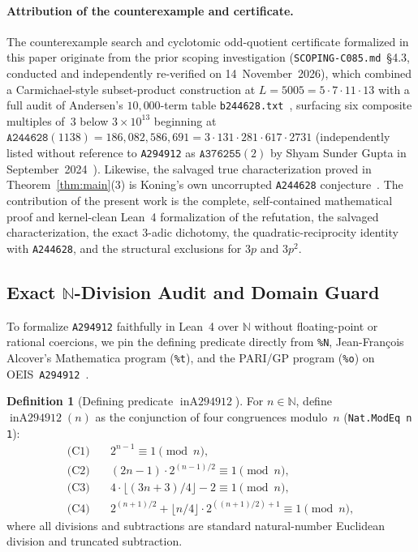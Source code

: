 \documentclass[11pt]{article}
\theoremstyle{definition}
\newtheorem{definition}[theorem]{Definition}
\newcommand{\N}{\mathbb{N}}
\newcommand{\seq}[1]{\texttt{#1}}
\newcommand{\inA}{\operatorname{inA294912}}
\begin{document}
\paragraph{Attribution of the counterexample and certificate.}
The counterexample search and cyclotomic odd-quotient certificate formalized in this paper originate from the prior scoping investigation (\texttt{SCOPING-C085.md}~\S4.3, conducted and independently re-verified on 14~November~2026), which combined a Carmichael-style subset-product construction at $L = 5005 = 5 \cdot 7 \cdot 11 \cdot 13$ with a full audit of Andersen's $10{,}000$-term table \texttt{b244628.txt}~\cite{b244628}, surfacing six composite multiples of~$3$ below $3 \times 10^{13}$ beginning at $\seq{A244628}(1138) = 186{,}082{,}586{,}691 = 3 \cdot 131 \cdot 281 \cdot 617 \cdot 2731$ (independently listed without reference to \seq{A294912} as $\seq{A376255}(2)$ by Shyam Sunder Gupta in September~2024~\cite{oeis376255}). Likewise, the salvaged true characterization proved in Theorem~\ref{thm:main}(3) is Koning's own uncorrupted \seq{A244628} conjecture~\cite{oeis244628}. The contribution of the present work is the complete, self-contained mathematical proof and kernel-clean Lean~4 formalization of the refutation, the salvaged characterization, the exact $3$-adic dichotomy, the quadratic-reciprocity identity with \seq{A244628}, and the structural exclusions for $3p$ and $3p^2$.

\subsection{Exact \texorpdfstring{$\N$}{N}-Division Audit and Domain Guard}
\label{sec:conventions}

To formalize \seq{A294912} faithfully in Lean~4 over $\N$ without floating-point or rational coercions, we pin the defining predicate directly from \texttt{\%N}, Jean-Fran\c{c}ois Alcover's Mathematica program (\texttt{\%t}), and the PARI/GP program (\texttt{\%o}) on OEIS~\seq{A294912}~\cite{oeis294912}.

\begin{definition}[Defining predicate $\inA$]
\label{def:inA294912}
For $n \in \N$, define $\inA(n)$ as the conjunction of four congruences modulo~$n$ (\texttt{Nat.ModEq n \textperiodcentered{} 1}):
\begin{align*}
\text{(C1)} &\quad 2^{n - 1} \equiv 1 \pmod n, \\
\text{(C2)} &\quad (2n - 1) \cdot 2^{(n - 1)/2} \equiv 1 \pmod n, \\
\text{(C3)} &\quad 4 \cdot \lfloor (3n + 3)/4 \rfloor - 2 \equiv 1 \pmod n, \\
\text{(C4)} &\quad 2^{(n + 1)/2} + \lfloor n / 4 \rfloor \cdot 2^{((n + 1)/2) + 1} \equiv 1 \pmod n,
\end{align*}
where all divisions and subtractions are standard natural-number Euclidean division and truncated subtraction.
\end{definition}
\end{document}
